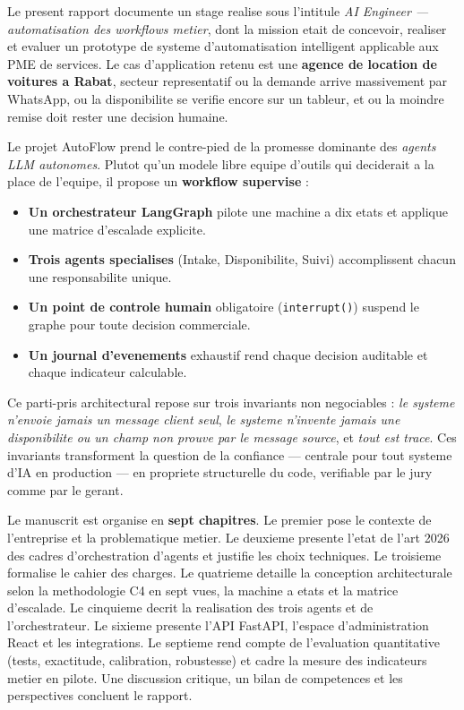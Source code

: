 \documentclass[12pt,a4paper,openany]{report}
\begin{document}
Le present rapport documente un stage realise sous l'intitule \emph{AI Engineer --- automatisation des workflows metier}, dont la mission etait de concevoir, realiser et evaluer un prototype de systeme d'automatisation intelligent applicable aux PME de services. Le cas d'application retenu est une \textbf{agence de location de voitures a Rabat}, secteur representatif ou la demande arrive massivement par WhatsApp, ou la disponibilite se verifie encore sur un tableur, et ou la moindre remise doit rester une decision humaine.

Le projet AutoFlow prend le contre-pied de la promesse dominante des \emph{agents LLM autonomes}. Plutot qu'un modele libre equipe d'outils qui deciderait a la place de l'equipe, il propose un \textbf{workflow supervise} :
\begin{itemize}
    \item[---] \textbf{Un orchestrateur LangGraph} pilote une machine a dix etats et applique une matrice d'escalade explicite.
    \item[---] \textbf{Trois agents specialises} (Intake, Disponibilite, Suivi) accomplissent chacun une responsabilite unique.
    \item[---] \textbf{Un point de controle humain} obligatoire (\texttt{interrupt()}) suspend le graphe pour toute decision commerciale.
    \item[---] \textbf{Un journal d'evenements} exhaustif rend chaque decision auditable et chaque indicateur calculable.
\end{itemize}

Ce parti-pris architectural repose sur trois invariants non negociables : \emph{le systeme n'envoie jamais un message client seul}, \emph{le systeme n'invente jamais une disponibilite ou un champ non prouve par le message source}, et \emph{tout est trace}. Ces invariants transforment la question de la confiance --- centrale pour tout systeme d'IA en production --- en propriete structurelle du code, verifiable par le jury comme par le gerant.

Le manuscrit est organise en \textbf{sept chapitres}. Le premier pose le contexte de l'entreprise et la problematique metier. Le deuxieme presente l'etat de l'art 2026 des cadres d'orchestration d'agents et justifie les choix techniques. Le troisieme formalise le cahier des charges. Le quatrieme detaille la conception architecturale selon la methodologie C4 en sept vues, la machine a etats et la matrice d'escalade. Le cinquieme decrit la realisation des trois agents et de l'orchestrateur. Le sixieme presente l'API FastAPI, l'espace d'administration React et les integrations. Le septieme rend compte de l'evaluation quantitative (tests, exactitude, calibration, robustesse) et cadre la mesure des indicateurs metier en pilote. Une discussion critique, un bilan de competences et les perspectives concluent le rapport.
\end{document}
